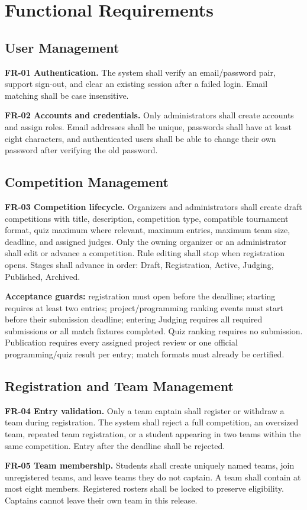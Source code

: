 \documentclass[12pt]{article}
\begin{document}
\section{Functional Requirements}
\subsection{User Management}
\textbf{FR-01 Authentication.} The system shall verify an email/password pair, support sign-out, and clear an existing session after a failed login. Email matching shall be case insensitive.\par
\textbf{FR-02 Accounts and credentials.} Only administrators shall create accounts and assign roles. Email addresses shall be unique, passwords shall have at least eight characters, and authenticated users shall be able to change their own password after verifying the old password.
\subsection{Competition Management}
\textbf{FR-03 Competition lifecycle.} Organizers and administrators shall create draft competitions with title, description, competition type, compatible tournament format, quiz maximum where relevant, maximum entries, maximum team size, deadline, and assigned judges. Only the owning organizer or an administrator shall edit or advance a competition. Rule editing shall stop when registration opens. Stages shall advance in order: Draft, Registration, Active, Judging, Published, Archived.

\textbf{Acceptance guards:} registration must open before the deadline; starting requires at least two entries; project/programming ranking events must start before their submission deadline; entering Judging requires all required submissions or all match fixtures completed. Quiz ranking requires no submission. Publication requires every assigned project review or one official programming/quiz result per entry; match formats must already be certified.
\subsection{Registration and Team Management}
\textbf{FR-04 Entry validation.} Only a team captain shall register or withdraw a team during registration. The system shall reject a full competition, an oversized team, repeated team registration, or a student appearing in two teams within the same competition. Entry after the deadline shall be rejected.\par
\textbf{FR-05 Team membership.} Students shall create uniquely named teams, join unregistered teams, and leave teams they do not captain. A team shall contain at most eight members. Registered rosters shall be locked to preserve eligibility. Captains cannot leave their own team in this release.
\end{document}
